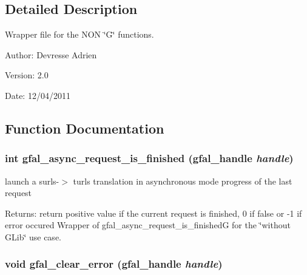 \subsection{Detailed Description}
Wrapper file for the NON \char`\"{}G\char`\"{} functions. 

\begin{Desc}
\item[Author:]Devresse Adrien \end{Desc}
\begin{Desc}
\item[Version:]2.0 \end{Desc}
\begin{Desc}
\item[Date:]12/04/2011 \end{Desc}


\subsection{Function Documentation}
\subsubsection{\setlength{\rightskip}{0pt plus 5cm}int gfal\_\-async\_\-request\_\-is\_\-finished (gfal\_\-handle {\em handle})}\label{gfal__common__interface_8c_ce6fcac8e92ad2e1d699eed2ce74a257}


launch a surls-$>$ turls translation in asynchronous mode progress of the last request 

\begin{Desc}
\item[Returns:]return positive value if the current request is finished, 0 if false or -1 if error occured Wrapper of gfal\_\-async\_\-request\_\-is\_\-finished\-G for the \char`\"{}without GLib\char`\"{} use case. \end{Desc}
\subsubsection{\setlength{\rightskip}{0pt plus 5cm}void gfal\_\-clear\_\-error (gfal\_\-handle {\em handle})}\label{gfal__common__interface_8c_4ca376cf47166fabd46a45fccb863ebe}


